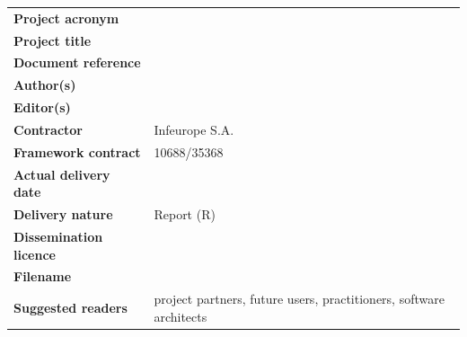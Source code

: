 \begin{flushleft}
\begin{table}[!b]
	  \begin{tabular}{p{4.5cm}p{\textwidth-5cm}}
		\textbf{Project acronym}       &   \DelAcronym \\
		\textbf{Project title}    &   \DelInitiative  \\ 
		\textbf{Document reference} 	&   \DelTitle \\	
		\textbf{Author(s)}             &   \DelAuthor \\
		\textbf{Editor(s)}             &   \DelAuthor \\
		\textbf{Contractor}    &   Infeurope S.A. \\
		\textbf{Framework contract}    &   10688/35368 \\		
		\textbf{Actual delivery date}  &   \DelDate \\    
		\textbf{Delivery nature}     	&   Report (R) \\
		\textbf{Dissemination licence} 	&   \doclicenseLongNameRef \\
		\textbf{Filename}           	&   \DelFilename\\
		\textbf{Suggested readers}    	&   project partners, future users, practitioners, software architects\\
	\end{tabular}
\end{table}
\end{flushleft}



\clearpage

\clearpage


\pagestyle{fancy}
\fancyhf{}
\rhead{\slshape{\DelTitle}}
\lhead{\slshape\nouppercase{\rightmark}}
\cfoot{\thepage}



